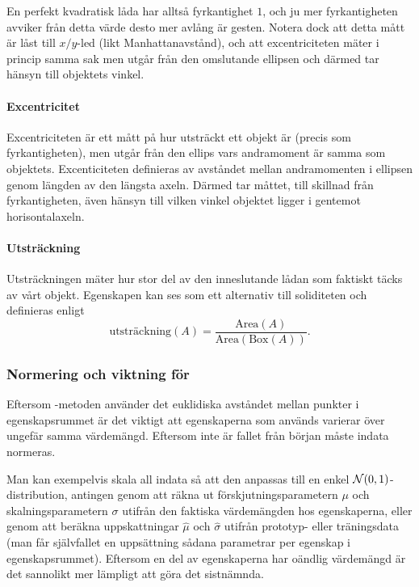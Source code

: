 \documentclass[../rapport_MVEX01-11-05]{subfiles}
\begin{document}
En perfekt kvadratisk låda har alltså fyrkantighet $1$, och ju mer
fyrkantigheten avviker från detta värde desto mer avlång är gesten.
Notera dock att detta mått är låst till $x/y$-led (likt Manhattanavstånd),
och att
excentriciteten mäter i princip samma sak men utgår från den
omslutande ellipsen och därmed tar hänsyn till objektets vinkel.

\paragraph{Excentricitet}

Excentriciteten är ett mått på hur utsträckt ett objekt är (precis som
fyrkantigheten), men utgår från den ellips
vars andramoment är samma som objektets. Excenticiteten definieras av avståndet
mellan andramomenten i ellipsen genom längden av den längsta axeln. Därmed
tar måttet, till skillnad från fyrkantigheten, även hänsyn till vilken vinkel
objektet ligger i gentemot horisontalaxeln.

\paragraph{Utsträckning}

Utsträckningen mäter hur stor del av den inneslutande lådan som
faktiskt täcks av vårt objekt. Egenskapen kan ses som ett alternativ
till soliditeten och definieras enligt
\begin{equation*}
  \textrm{utsträckning}(A) =
  \frac{\textrm{Area}(A)}{\textrm{Area}(\textrm{Box}(A))}.
\end{equation*}

\subsubsection{Normering och viktning för \knn}

Eftersom \knn-metoden använder det euklidiska avståndet mellan punkter i 
egenskapsrummet är det viktigt att egenskaperna som används varierar över
ungefär samma värdemängd. Eftersom inte är fallet från början måste indata
normeras.

Man kan exempelvis skala all indata så att den anpassas till en enkel
$\mathcal{N}(0,1)$-distribution, antingen genom att räkna ut förskjutningsparametern
$\mu$ och skalningsparametern $\sigma$ utifrån den faktiska värdemängden hos
egenskaperna, eller genom att beräkna uppskattningar $\hat\mu$ och $\hat\sigma$
utifrån prototyp- eller träningsdata (man får självfallet en uppsättning sådana
parametrar per egenskap i egenskapsrummet). Eftersom en del av egenskaperna har
oändlig värdemängd är det sannolikt mer lämpligt att göra det sistnämnda.
\end{document}
